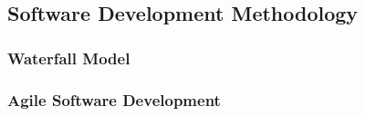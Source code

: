 \subsection{Software Development Methodology}

\subsubsection{Waterfall Model}

\subsubsection{Agile Software Development}